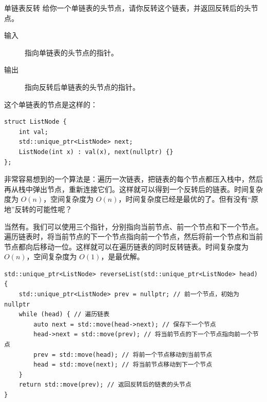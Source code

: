 \begin{example}{单链表反转}{}
    给你一个单链表的头节点，请你反转这个链表，并返回反转后的头节点。
    \begin{description}
        \item[输入] 指向单链表的头节点的指针。
        \item[输出] 指向反转后单链表的头节点的指针。
    \end{description}
    这个单链表的节点是这样的：
    \begin{verbatim}
struct ListNode {
    int val;
    std::unique_ptr<ListNode> next;
    ListNode(int x) : val(x), next(nullptr) {}
};
    \end{verbatim}
    \tcblower
    非常容易想到的一个算法是：遍历一次链表，把链表的每个节点都压入栈中，然后再从栈中弹出节点，重新连接它们。这样就可以得到一个反转后的链表。时间复杂度为 $O(n)$，空间复杂度为 $O(n)$，时间复杂度已经是最优的了。但有没有“原地”反转的可能性呢？

    当然有。我们可以使用三个指针，分别指向当前节点、前一个节点和下一个节点。遍历链表时，将当前节点的下一个节点指向前一个节点，然后将前一个节点和当前节点都向后移动一位。这样就可以在遍历链表的同时反转链表。时间复杂度为 $O(n)$，空间复杂度为 $O(1)$，是最优解。
    \begin{verbatim}
std::unique_ptr<ListNode> reverseList(std::unique_ptr<ListNode> head) {
    std::unique_ptr<ListNode> prev = nullptr; // 前一个节点，初始为 nullptr
    while (head) { // 遍历链表
        auto next = std::move(head->next); // 保存下一个节点
        head->next = std::move(prev); // 将当前节点的下一个节点指向前一个节点
        prev = std::move(head); // 将前一个节点移动到当前节点
        head = std::move(next); // 将当前节点移动到下一个节点
    }
    return std::move(prev); // 返回反转后的链表的头节点
}
    \end{verbatim}
\end{example}